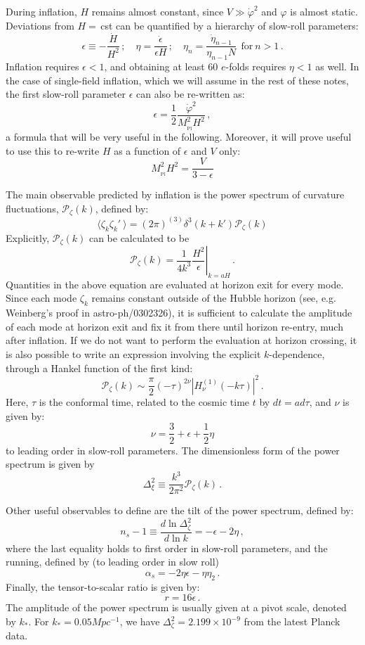 \documentclass[prd, onecolumn, floatfix, letterpaper, nofootinbib, amsmath, amssymb, superscriptaddress]{revtex4}
\renewcommand{\(}{\left(}
\renewcommand{\)}{\right)}
\renewcommand{\[}{\left[}
\renewcommand{\]}{\right]}
\def\be{\begin{equation}}
\def\ee{\end{equation}}
\newcommand{\Mp}{M_{_\mathrm{Pl}}}
\begin{document}
During inflation, $H$ remains almost constant, since $V\gg\dot\varphi^2$ and $\varphi$ is almost static. Deviations from $H=\,$cst can be quantified by a hierarchy of slow-roll parameters:
\be
	\epsilon\equiv-\frac{\dot H}{H^2}\, ;\quad \eta=\frac{\dot \epsilon}{\epsilon H}\, ; \quad \eta_n=\frac{\dot{\eta}_{n-1}}{\eta_{n-1}N} ~~\mathrm{for~}n>1\, .
\ee
Inflation requires $\epsilon<1$, and obtaining at least 60 $e$-folds requires $\eta<1$ as well. In the case of single-field inflation, which we will assume in the rest of these notes, the first slow-roll parameter $\epsilon$ can also be re-written as:
\be
	\epsilon=\frac{1}{2}\frac{\dot\varphi^2}{\Mp^2H^2}\, ,
\ee
a formula that will be very useful in the following. Moreover, it will prove useful to use this to re-write $H$ as a function of $\epsilon$ and $V$ only:
\be
\label{eq:HnVrel}
	\Mp^2H^2=\frac{V}{3-\epsilon}
\ee

\bigskip 
The main observable predicted by inflation is the power spectrum of curvature fluctuations, $\mathcal{P}_\zeta (k)$, defined by:
\be
	\langle \zeta_k \zeta_k'\ \rangle=(2\pi)^{(3)}\delta^3(k+k')\mathcal{P}_\zeta(k)
\ee
Explicitly, $\mathcal{P}_\zeta (k)$ can be calculated to be
\be
	\mathcal{P}_\zeta(k)=\left.\frac{1}{4 k^3}\frac{H^2}{\epsilon}\right|_{k=aH}\, .
\ee
Quantities in the above equation are evaluated at horizon exit for every mode. Since each mode $\zeta_k$ remains constant outside of the Hubble horizon (see, e.g. Weinberg's proof in astro-ph/0302326), it is sufficient to calculate the amplitude of each mode at horizon exit and fix it from there until horizon re-entry, much after inflation.  If we do not want to perform the evaluation at horizon crossing, it is also possible to write an expression involving the explicit $k$-dependence, through a Hankel function of the first kind:
\be
	\mathcal{P}_\zeta(k)\sim \frac{\pi}{2}(-\tau)^{2\nu}\left| H^{(1)}_\nu(-k\tau)\right|^2\, .
\ee
Here, $\tau$ is the conformal time, related to the cosmic time $t$ by $dt=ad\tau$, and $\nu$ is given by:
\be
	\nu=\frac{3}{2}+\epsilon+\frac{1}{2}\eta
\ee
to leading order in slow-roll parameters. 
The dimensionless form of the power spectrum is given by
\be
	\Delta^2_\xi\equiv\frac{k^3}{2\pi^2}\mathcal{P}_\zeta(k)\,.
\ee


Other useful observables to define are the tilt of the power spectrum, defined by:
\be
	n_s-1\equiv\frac{d\ln\Delta^2_\zeta}{d\ln k}=-\epsilon-2\eta\, ,
\ee
where the last equality holds to first order in slow-roll parameters, and the running, defined by (to leading order in slow roll)
\be
	\alpha_s=-2\eta\epsilon-\eta\eta_2\, .
\ee
Finally, the tensor-to-scalar ratio is given by:
\be
	r=16\epsilon\, .
\ee
The amplitude of the power spectrum is usually given at a pivot scale, denoted by $k_*$. For $k_*=0.05Mpc^{-1}$, we have $\Delta^2_\zeta=2.199\times10^{-9}$ from the latest Planck data.
\end{document}
